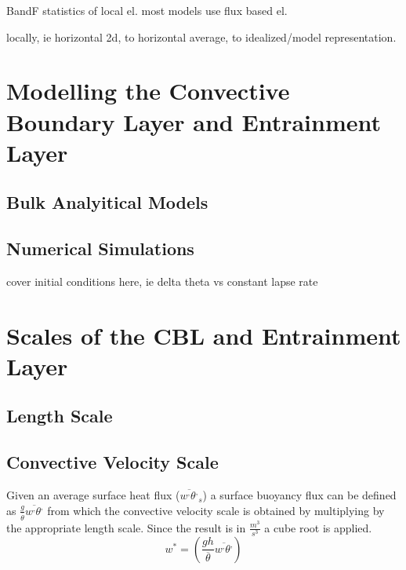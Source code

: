BandF statistics of local el.  most models use flux based el.

locally, ie horizontal 2d, to horizontal average, to idealized/model representation.

\section{Modelling the Convective Boundary Layer and Entrainment Layer}
\label{sec:}

\subsection{Bulk Analyitical Models}
\label{subsec:}

\subsection{Numerical Simulations}
\label{subsec:}

cover initial conditions here, ie delta theta vs constant lapse rate

\section{Scales of the CBL and Entrainment Layer}
\label{sec:}

\subsection{Length Scale}
\label{subsec:}


\subsection{Convective Velocity Scale}
\label{subsec:}

Given an average surface heat flux ($\overline{w^{,}\theta^{,}}_{s}$) a surface buoyancy flux can be defined as 
$\frac{g}{\overline{\theta}}\overline{w^{,}\theta^{,}}$ from which the convective velocity scale is obtained by
multiplying by the appropriate length scale.  Since the result is in $\frac{m^{3}}{s^{3}}$ a cube root is applied.\\

\begin{equation}
w^{*} = \left( \frac{gh}{\overline{\theta}}\overline{w^{,}\theta^{,}} \right)
\end{equation}

